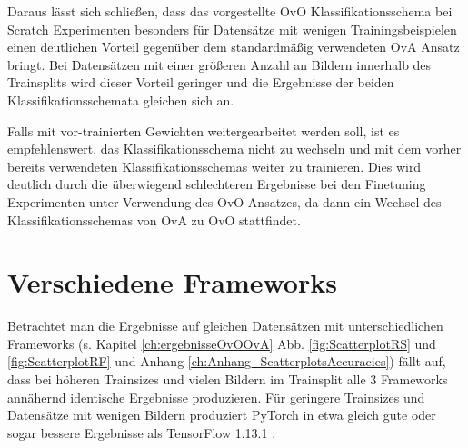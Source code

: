 Daraus lässt sich schließen, dass das vorgestellte OvO Klassifikationsschema bei Scratch Experimenten besonders für Datensätze mit wenigen Trainingsbeispielen einen deutlichen Vorteil gegenüber dem standardmäßig verwendeten OvA Ansatz bringt. Bei Datensätzen mit einer größeren Anzahl an Bildern innerhalb des Trainsplits wird dieser Vorteil geringer und die Ergebnisse der beiden Klassifikationsschemata gleichen sich an.


Falls mit vor-trainierten Gewichten weitergearbeitet werden soll, ist es empfehlenswert, das Klassifikationsschema nicht zu wechseln und mit dem vorher bereits verwendeten Klassifikationsschemas weiter zu trainieren. Dies wird deutlich durch die überwiegend schlechteren Ergebnisse bei den Finetuning Experimenten unter Verwendung des OvO Ansatzes, da dann ein Wechsel des Klassifikationsschemas von OvA zu OvO stattfindet.


\section{Verschiedene Frameworks}
\label{ch:diskussionFrameworks}

Betrachtet man die Ergebnisse auf gleichen Datensätzen mit unterschiedlichen Frameworks (s. Kapitel \ref{ch:ergebnisseOvOOvA} Abb. \ref{fig:ScatterplotRS} und \ref{fig:ScatterplotRF} und Anhang \ref{ch:Anhang_ScatterplotsAccuracies}) fällt auf, dass bei höheren Trainsizes und vielen Bildern im Trainsplit alle 3 Frameworks annähernd identische Ergebnisse produzieren. Für geringere Trainsizes und Datensätze mit wenigen Bildern 
produziert PyTorch \cite{pytorch} in etwa gleich gute oder sogar bessere Ergebnisse als TensorFlow 1.13.1 \cite{tensorflow}. 


